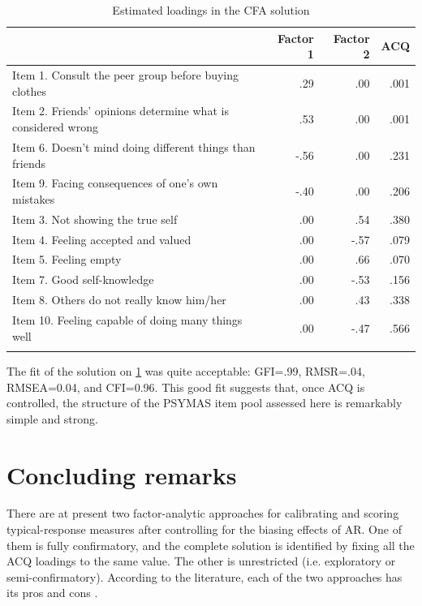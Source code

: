 \begin{table}[H]
  \caption{\label{tab8}Estimated loadings in the CFA solution}
  \centering
  \begin{tabular}{ l r r r}
    \hline\noalign{\smallskip}
    & Factor 1  & Factor 2  &  ACQ\\
    \hline\noalign{\smallskip}
    Item 1. Consult the peer group before buying clothes      & .29    & .00    & .001 \\
    Item 2. Friends' opinions determine what is considered wrong  & .53    & .00    & .001 \\
    Item 6. Doesn't mind doing different things than friends      & -.56  & .00    & .231 \\
    Item 9. Facing consequences of one's own mistakes      & -.40  & .00    & .206 \\
    Item 3. Not showing the true self              & .00    & .54    & .380 \\
    Item 4. Feeling accepted and valued            & .00    & -.57  & .079 \\
    Item 5. Feeling empty                  & .00    & .66    & .070 \\
    Item 7. Good self-knowledge              & .00    & -.53  & .156 \\
    Item 8. Others do not really know him/her          & .00    & .43    & .338 \\
    Item 10. Feeling capable of doing many things well      & .00    & -.47  & .566 \\
    \hline\noalign{\smallskip}
    \multicolumn{4}{l}{Note: ACQ = Acquiescence}
  \end{tabular}
\end{table}

The fit of the solution on \cref{tab8} was quite acceptable: GFI=.99, RMSR=.04, RMSEA=0.04, and CFI=0.96. This good fit suggests that, once ACQ is controlled, the structure of the PSYMAS item pool assessed here is remarkably simple and strong.

\section{Concluding remarks}

There are at present two factor-analytic approaches for calibrating and scoring typical-response measures after controlling for the biasing effects of AR. One of them is fully confirmatory, and the complete solution is identified by fixing all the ACQ loadings to the same value. The other is unrestricted (i.e. exploratory or semi-confirmatory). According to the literature, each of the two approaches has its pros and cons \citep{Savalei:2014, delaFuente:2020}.

